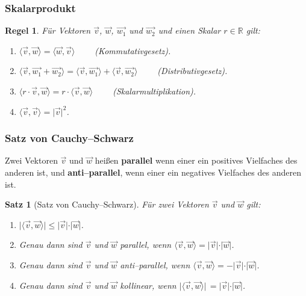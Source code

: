 \documentclass[hyperref={pdfpagelabels=false}]{beamer}
\theoremstyle{plain}%
\newtheorem*{satz}{Satz}
\newtheorem*{regel}{Regel}
\theoremstyle{definition}
\theoremstyle{remark}
\newcommand{\vektor}[1]{\overrightarrow{#1}}
\begin{document}
\begin{frame}
\frametitle{Skalarprodukt}

\begin{regel}\label{uvr_regel_scalar} Für Vektoren $\vektor{v}$, $\vektor{w}$, 
$\vektor{w_1}$ und $\vektor{w_2}$ und einen Skalar $r \in \mathbb R$ gilt:
\begin{enumerate}
\item<2-> $\langle \vektor{v}, \vektor{w} \rangle = \langle \vektor{w}, 
\vektor{v} \rangle \qquad$ (\textit{Kommutativgesetz}).
\item<3-> $\langle \vektor{v}, \vektor{w_1} + \vektor{w_2} \rangle = 
\langle \vektor{v}, \vektor{w_1} \rangle + \langle \vektor{v}, 
\vektor{w_2} \rangle \qquad$ (\textit{Distributivgesetz}).
\item<4-> $\langle r \cdot \vektor{v}, \vektor{w} \rangle = r \cdot \langle \vektor{v}, 
\vektor{w} \rangle \qquad$ (\textit{Skalarmultiplikation}).
\item<5-> $\langle \vektor{v}, \vektor{v} \rangle = \vert \vektor{v} \vert^2$.
\end{enumerate}
\end{regel}

\end{frame}

\begin{frame}
\frametitle{Satz von Cauchy--Schwarz}

Zwei Vektoren $\vektor{v}$ und $\vektor{w}$ heißen \textbf{parallel} wenn einer ein positives 
Vielfaches des anderen ist, und \textbf{anti--parallel}, wenn einer ein negatives Vielfaches des anderen ist. 

\pause
\begin{satz}[Satz von Cauchy--Schwarz]\label{uvr_cauchy_schwarz} 
Für zwei Vektoren $\vektor{v}$ und $\vektor{w}$ gilt:
\begin{enumerate}
\item<3-> $ \vert \langle \vektor{v},  \vektor{w} \rangle \vert \leq \vert \vektor{v} 
        \vert \cdot \vert \vektor{w} \vert $.
\item<4-> Genau dann sind $\vektor{v}$ und $\vektor{w}$ parallel, wenn $\langle \vektor{v}, 
\vektor{w} \rangle = \vert \vektor{v} \vert \cdot  \vert \vektor{w} \vert$.
\item<5-> Genau dann sind $\vektor{v}$ und $\vektor{w}$ anti--parallel, wenn $\langle 
\vektor{v}, \vektor{w} \rangle = 
- \vert \vektor{v} \vert \cdot  \vert \vektor{w} \vert$.
\item<6-> Genau dann sind $\vektor{v}$ und $\vektor{w}$ kollinear, wenn 
$\vert \langle \vektor{v}, \vektor{w} \rangle \vert \, 
= \vert \vektor{v} \vert \cdot  \vert \vektor{w} \vert$.
\end{enumerate}
\end{satz}

\end{frame}
\end{document}
